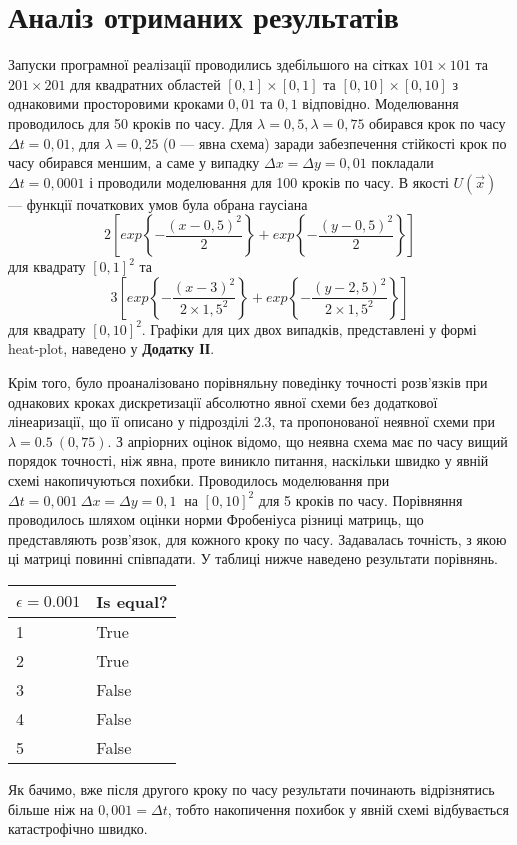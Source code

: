 \section{Аналіз отриманих результатів}
Запуски програмної реалізації проводились здебільшого на сітках $101\times 101$ та $201\times 201$ для квадратних областей $[0,1]\times [0,1]$ та $[0,10]\times [0,10]$ з однаковими просторовими кроками $0,01$ та $0,1$ відповідно. Моделювання проводилось для 50 кроків по часу. Для $\lambda = 0,5, \lambda = 0,75$ обирався крок по часу $\Delta t = 0,01$, для $\lambda = 0,25$ (0 --- явна схема) заради забезпечення стійкості крок по часу обирався меншим, а саме у випадку $\Delta x = \Delta y = 0,01$ покладали $\Delta t = 0,0001$ і проводили моделювання для 100 кроків по часу. В якості $U(\vec{x})$ --- функції початкових умов була обрана гаусіана
\begin{equation}
2\left[exp\left\{-\frac{(x-0,5)^2}{2}\right\} + exp\left\{-\frac{(y-0,5)^2}{2}\right\}\right]
\end{equation}
для квадрату $[0,1]^2$ та
\begin{equation}
3\left[exp\left\{-\frac{(x-3)^2}{2\times 1,5^2}\right\} + exp\left\{-\frac{(y-2,5)^2}{2\times 1,5^2}\right\}\right]
\end{equation}
для квадрату $[0,10]^2$.
Графіки для цих двох випадків, представлені у формі heat-plot, наведено у \textbf{Додатку ІІ}.

Крім того, було проаналізовано порівняльну поведінку точності розв’язків при однакових кроках дискретизації абсолютно явної схеми без додаткової лінеаризації, що її описано у підрозділі 2.3, та пропонованої неявної схеми при $\lambda = 0.5\ (0,75)$. З апріорних оцінок відомо, що неявна схема має по часу вищий порядок точності, ніж явна, проте виникло питання, наскільки швидко у явній схемі накопичуються похибки. Проводилось моделювання при $\Delta t = 0,001\ \Delta x = \Delta y = 0,1\ $ на $[0,10]^2$ для 5 кроків по часу. Порівняння проводилось шляхом оцінки норми Фробеніуса різниці матриць, що представляють розв’язок, для кожного кроку по часу. Задавалась точність, з якою ці матриці повинні співпадати. У таблиці нижче наведено результати порівнянь. 
\begin{center}
	\begin{tabular}{|l|l|}
	\hline
	$\epsilon = 0.001$ & Is equal? \\ \hline
	1 & True \\ \hline
	2 & True \\ \hline
	3 & False \\ \hline
	4 & False \\ \hline
	5 & False \\ \hline
	\end{tabular}
\end{center} 
\vspace{10pt}
Як бачимо, вже після другого кроку по часу результати починають відрізнятись більше ніж на $0,001 = \Delta t$, тобто накопичення похибок у явній схемі відбувається катастрофічно швидко.

